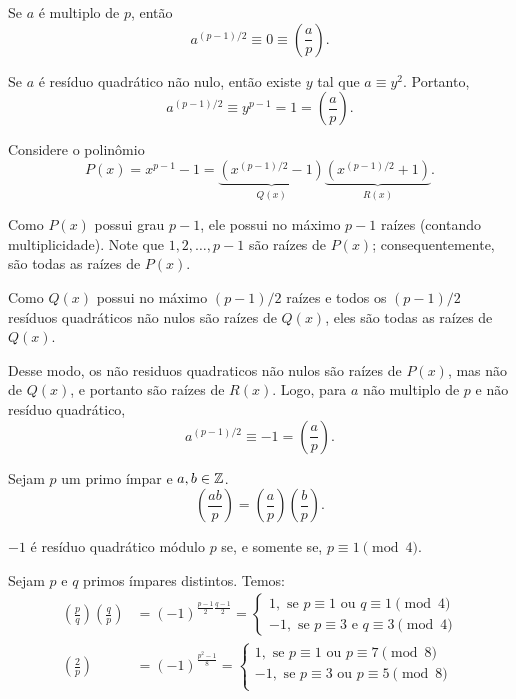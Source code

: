 \documentclass[10pt, a4paper]{report}
\newcommand{\leg}[2]{\left(\frac{#1}{#2}\right)}
\begin{document}
	\begin{dem}
		Se $a$ é multiplo de $p$, então \[ a^{(p-1)/2} \equiv 0 \equiv \leg{a}{p}.\]

		Se $a$ é resíduo quadrático não nulo, então existe $y$ tal que $a \equiv y^2$. Portanto, \[a^{(p-1)/2} \equiv y^{p-1} = 1 = \leg{a}{p}.\]
		
		Considere o polinômio \[P(x) = x^{p-1} - 1 = \underbrace{(x^{(p-1)/2} - 1)}_{Q(x)}\underbrace{(x^{(p-1)/2} + 1)}_{R(x)}.\]
		
		Como $P(x)$ possui grau $p-1$, ele possui no máximo $p-1$ raízes (contando multiplicidade). Note que $1, 2, \dots, p-1$ são raízes de $P(x)$; consequentemente, são todas as raízes de $P(x)$.

		Como $Q(x)$ possui no máximo $(p-1)/2$ raízes e todos os $(p-1)/2$ resíduos quadráticos não nulos são raízes de $Q(x)$, eles são todas as raízes de $Q(x)$.

		Desse modo, os não residuos quadraticos não nulos são raízes de $P(x)$, mas não de $Q(x)$, e portanto são raízes de $R(x)$. Logo, para  $a$ não multiplo de $p$ e não resíduo quadrático, 
		\[a^{(p-1)/2} \equiv -1 = \leg{a}{p}.\]
	\end{dem}
	\begin{cor}
		Sejam $p$ um primo ímpar e $a, b \in \mathbb{Z}$.
		$$\leg{ab}{p} = \leg{a}{p}\leg{b}{p}.$$
	\end{cor}
	\begin{cor}
		$-1$ é resíduo quadrático módulo ${p}$ se, e somente se, $p \equiv 1 \pmod{4}$.
	\end{cor}
	\begin{thm}
		Sejam $p$ e $q$ primos ímpares distintos. Temos:
		\begin{align*}
			\leg{p}{q} \leg{q}{p} & = (-1)^{\frac{p-1}{2}\frac{q-1}{2}} =
				\begin{cases}
					1,  \text{\ se $p \equiv 1$ ou $q \equiv 1$}\pmod{4}\\
					-1, \text{\ se $p \equiv 3$ e  $q \equiv 3$}\pmod{4}
				\end{cases}	\\
			\leg{2}{p} & = (-1)^\frac{p^2 - 1}{8} =
				\begin{cases}
					1, \text{\ se $p \equiv 1$ ou $p \equiv 7$}\pmod{8}\\
					-1, \text{\ se $p \equiv 3$ ou $p \equiv 5$}\pmod{8}\\
				\end{cases}
		\end{align*}
	\end{thm}
\end{document}
